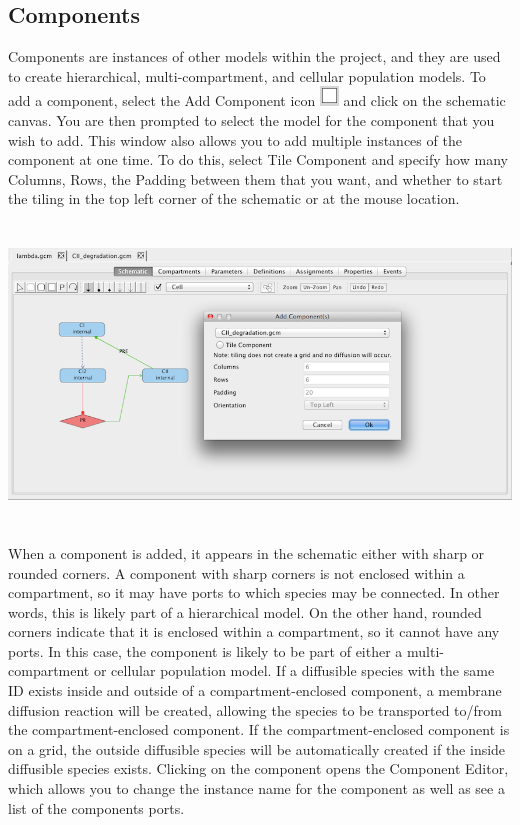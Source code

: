 \documentclass[titlepage,11pt]{article}
\begin{document}
\subsection{\label{Components}Components}

\noindent
Components are instances of other models within the project, and they are used to create hierarchical, multi-compartment, and cellular population models.  To add a component, select the Add Component icon \includegraphics{../gui/icons/modelview/add_component_selected} and click on the schematic canvas.  You are then prompted to select the model for the component that you wish to add.  This window also allows you to add multiple instances of the component at one time.  To do this, select Tile Component and specify how many Columns, Rows, the Padding between them that you want, and whether to start the tiling in the top left corner of the schematic or at the mouse location.  

\begin{center}
\includegraphics[height=80mm]{screenshots/addComponent}
\end{center}

When a component is added, it appears in the schematic either with sharp or rounded corners.  A component with sharp corners is not enclosed within a compartment, so it may have ports to which species may be connected.  In other words, this is likely part of a hierarchical model.  On the other hand, rounded corners indicate that it is enclosed within a compartment, so it cannot have any ports.  In this case, the component is likely to be part of either a multi-compartment or cellular population model.  If a diffusible species with the same ID exists inside and outside of a compartment-enclosed component, a membrane diffusion reaction will be created, allowing the species to be transported to/from the compartment-enclosed component.  If the compartment-enclosed component is on a grid, the outside diffusible species will be automatically created if the inside diffusible species exists.  Clicking on the component opens the Component Editor, which allows you to change the instance name for the component as well as see a list of the components ports.
\end{document}
